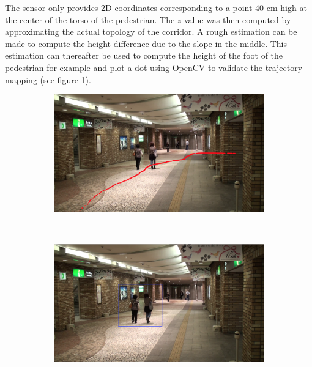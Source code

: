 \documentclass[12pt,a4paper,twoside]{article}
\begin{document}
The sensor only provides 2D coordinates corresponding to a point 40 cm high at the center of the torso of the pedestrian. The $z$ value was then computed by approximating the actual topology of the corridor. A rough estimation can be made to compute the height difference due to the slope in the middle. This estimation can thereafter be used to compute the height of the foot of the pedestrian for example and plot a dot using OpenCV to validate the trajectory mapping (see figure \ref{middle_point_traj}).


\begin{figure}
    \centering
    \begin{subfigure}[b]{0.45\textwidth}
        \includegraphics[width=\textwidth]{images/middle_point_traj}
        \caption{}
        \label{middle_point_traj}
    \end{subfigure}
    ~
    \begin{subfigure}[b]{0.45\textwidth}
        \includegraphics[width=\textwidth]{images/bounding_box}
        \caption{}
        \label{bounding_box}
    \end{subfigure}
    ~
    \begin{subfigure}[b]{0.45\textwidth}

\end{subfigure}
\end{figure}
\end{document}
